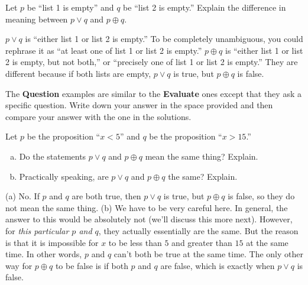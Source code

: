 \begin{exer}
Let $p$ be ``list 1 is empty'' and $q$ be ``list 2 is empty.''
Explain the difference in meaning between $p\vee q$ and $p\oplus q$.\\
\answerlinethree
\begin{answer}
$p\vee q$ is ``either list 1 or list 2 is empty.''  To be completely unambiguous, 
you could rephrase it as ``at least one of list 1 or list 2 is empty.''
$p\oplus q$ is ``either list 1 or list 2 is empty, but not both,'' or
``precisely one of list 1 or list 2 is empty.''
They are different because if both lists are empty, $p\vee q$ is true, but $p\oplus q$ is false.
\end{answer}
\end{exer}

\begin{rem}
The {\bf Question} examples are similar to the {\bf Evaluate} ones except that they ask a specific question.
Write down your answer in the space provided and then compare your answer with the one in the solutions.
\end{rem}

\begin{ques}
Let $p$ be the proposition ``$x<5$'' and $q$ be the proposition ``$x>15$.''
\begin{enumerate}[(a)]
\item
Do the statements $p\vee q$ and $p\oplus q$ mean the same thing? Explain.\\
\answerlinetwo
\item
Practically speaking, are $p\vee q$ and $p\oplus q$ the same?  Explain.\\
\answerlinetwo
\end{enumerate}
\begin{answer}
(a) No.  If $p$ and $q$ are both true, then $p\vee q$ is true, but $p\oplus q$ is false, so they do not mean the same thing.
(b) We have to be very careful here.  In general, the answer to this would be absolutely not
(we'll discuss this more next).
However, for {\em this particular $p$ and $q$}, they actually essentially are the same.
But the reason is that it is impossible for $x$ to be less than $5$ and greater than $15$ at
the same time.  In other words, $p$ and $q$ can't both be true at the same time.
The only other way for $p\oplus q$ to be false is if both $p$ and $q$ are false, which is 
exactly when $p\vee q$ is false.
\end{answer}
\end{ques}

